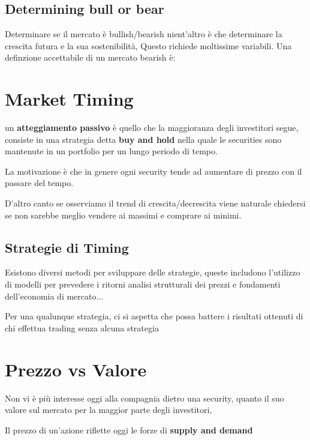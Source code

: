 \documentclass[a4paper,11pt]{report}
\begin{document}
{\subsection{Determining bull or bear}
	Determinare se il mercato è bullish/bearish nient'altro è che determinare la crescita futura e la sua sostenibilità, \newline
	Questo richiede moltissime variabili. \newline
	Una definzione accettabile di un mercato bearish è: 

\emph{}

\section{Market Timing}
	un \textbf{atteggiamento passivo} è quello che la maggioranza degli investitori segue, consiste in una strategia detta 				\textbf{buy and hold} nella quale le securities sono mantenute in un portfolio per un lungo periodo di tempo.

	La motivazione è che in genere ogni security tende ad aumentare di prezzo con il passare del tempo.

	D'altro canto se osserviamo il trend di crescita/decrescita viene naturale chiedersi se non sarebbe meglio vendere ai massimi e 	comprare ai minimi.
\subsection{Strategie di Timing}
	Esistono diversi metodi per sviluppare delle strategie, queste includono l'utilizzo di modelli per prevedere i ritorni %
	analisi strutturali dei prezzi e fondamenti dell'economia di mercato...

	Per una qualunque strategia, ci si aspetta che possa battere i risultati ottenuti di chi effettua trading senza alcuna strategia
\section{Prezzo vs Valore}
	Non vi è più interesse oggi alla compagnia dietro una security, quanto il suo valore sul mercato per la maggior parte degli 		 	investitori,

	Il prezzo di un'azione riflette oggi le forze di \textbf{supply and demand}
}
\end{document}
